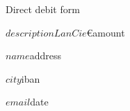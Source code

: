 \documentclass[a4paper]{article}
\begin{document}
Direct debit form

$description

LanCie

\euro $amount

$name

$address

$city

$iban

$email

$date
\end{document}
